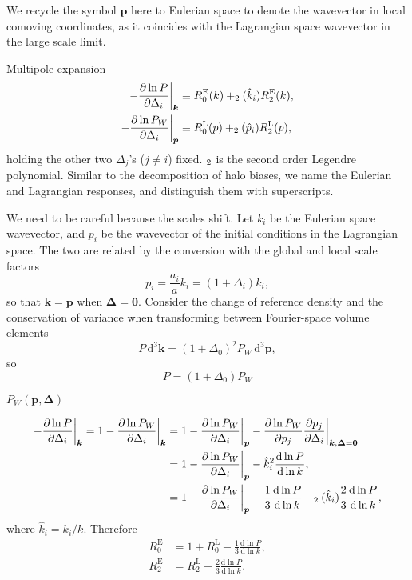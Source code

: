 \documentclass[a4paper,11pt]{article}
\let\L\relax
\DeclareMathOperator{\L}{\mathcal{L}}
\renewcommand{\d}{\mathrm{d}}
\newcommand{\vk}{{\bm k}}
\newcommand{\vp}{{\bm p}}
\newcommand{\vDelta}{{\bm\Delta}}
\newcommand{\Euler}{\mathrm{E}}
\newcommand{\Lagrange}{\mathrm{L}}
\begin{document}
We recycle the symbol $\vp$ here to Eulerian space to denote the wavevector in
local comoving coordinates, as it coincides with the Lagrangian space
wavevector in the large scale limit.

Multipole expansion
\begin{align}
    - \frac{\partial\ln P}{\partial\Delta_i} \bigg|_\vk
    &\equiv R^\Euler_0(k) + \L_2(\hat k_i) R^\Euler_2(k), \nonumber\\
    - \frac{\partial\ln P_W}{\partial\Delta_i} \bigg|_\vp
    &\equiv R^\Lagrange_0(p) + \L_2(\hat p_i) R^\Lagrange_2(p),
\end{align}
holding the other two $\Delta_j$'s ($j \neq i$) fixed.
$\L_2$ is the second order Legendre polynomial.
Similar to the decomposition of halo biases, we name the Eulerian and
Lagrangian responses, and distinguish them with superscripts.

We need to be careful because the scales shift.
Let $k_i$ be the Eulerian space wavevector, and $p_i$ be the wavevector of the
initial conditions in the Lagrangian space.
The two are related by the conversion with the global and local scale factors
\begin{equation}
    p_i = \frac{a_i}a k_i = (1 + \Delta_i) k_i,
\end{equation}
so that $\vk = \vp$ when $\vDelta = \bm0$.
Consider the change of reference density and the conservation of variance when
transforming between Fourier-space volume elements
\begin{equation}
    P \,\d^3\vk = (1 + \Delta_0)^2 P_W \,\d^3\vp,
\end{equation}
so
\begin{equation}
    P = (1 + \Delta_0) P_W
\end{equation}

$P_W(\vp, \vDelta)$

\begin{align}
    - \frac{\partial\ln P}{\partial\Delta_i} \bigg|_\vk
    = 1 - \frac{\partial\ln P_W}{\partial\Delta_i} \bigg|_\vk
    &= 1 - \frac{\partial\ln P_W}{\partial\Delta_i} \bigg|_\vp
    - \frac{\partial\ln P_W}{\partial p_j}
        \frac{\partial p_j}{\partial \Delta_i} \bigg|_{\vk, \vDelta=\bm0}
    \nonumber\\
    &= 1 - \frac{\partial\ln P_W}{\partial\Delta_i} \bigg|_\vp
    - \hat k_i^2 \frac{\d\ln P}{\d\ln k}, \nonumber\\
    &= 1 - \frac{\partial\ln P_W}{\partial\Delta_i} \bigg|_\vp
    - \frac13 \frac{\d\ln P}{\d\ln k}
    - \L_2(\hat k_i) \frac23 \frac{\d\ln P}{\d\ln k},
\end{align}
where $\hat k_i = k_i / k$.
Therefore
\begin{align}
    R^\Euler_0 &= 1 + R^\Lagrange_0 - \frac13 \frac{\d\ln P}{\d\ln k},
    \nonumber\\
    R^\Euler_2 &= R^\Lagrange_2 - \frac23 \frac{\d\ln P}{\d\ln k}.
\end{align}
\end{document}
